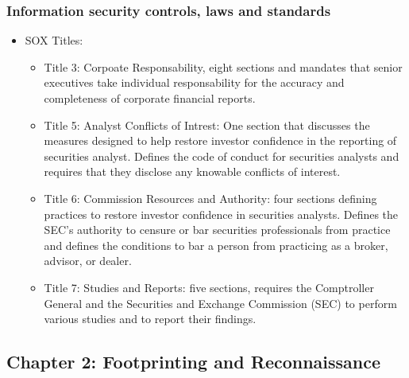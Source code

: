 \subsubsection{Information security controls, laws and standards}
\begin{itemize}
    \item SOX Titles:
    \begin{itemize}
        \item Title 3: Corpoate Responsability, eight sections and mandates that senior executives take individual responsability for the accuracy and completeness of corporate financial reports.
        \item Title 5: Analyst Conflicts of Intrest: One section that discusses the measures designed to help restore investor confidence in the reporting of securities analyst. Defines the code of conduct for securities analysts and requires that they disclose any knowable conflicts of interest.
        \item Title 6: Commission Resources and Authority: four sections defining practices to restore investor confidence in securities analysts. Defines the SEC's authority to censure or bar securities professionals from practice and defines the conditions to bar a person from practicing as a broker, advisor, or dealer.
        \item Title 7: Studies and Reports: five sections, requires the Comptroller General and the Securities and Exchange Commission (SEC) to perform various studies and to report their findings.
    \end{itemize}
\end{itemize}
\subsection{Chapter 2: Footprinting and Reconnaissance}
